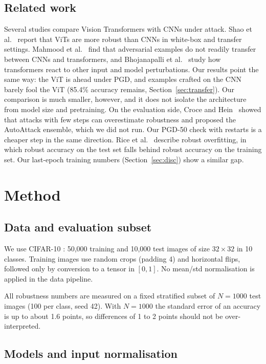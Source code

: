 \documentclass[twoside,a4paper,11pt]{article}
\begin{document}
\subsection{Related work}

Several studies compare Vision Transformers with CNNs under attack.
Shao et al.~\cite{Shao:22} report that ViTs are more robust than CNNs in
white-box and transfer settings. Mahmood et
al.~\cite{Mahmood:21} find that adversarial examples do not readily
transfer between CNNs and transformers, and
Bhojanapalli et al.~\cite{Bhojanapalli:21} study how transformers react to
other input and model perturbations. Our results point the same way: the
ViT is ahead under PGD, and examples crafted on the CNN barely fool the
ViT (85.4\% accuracy remains, Section~\ref{sec:transfer}). Our comparison is much
smaller, however, and it does not isolate the architecture from model size
and pretraining.
On the evaluation side, Croce and Hein~\cite{Croce:20} showed that
attacks with few steps can overestimate robustness and proposed the
AutoAttack ensemble, which we did not run. Our PGD-50 check with
restarts is a cheaper step in the same direction. Rice et
al.~\cite{Rice:20} describe robust overfitting, in which robust accuracy
on the test set falls behind robust accuracy on the training set. Our
last-epoch training numbers (Section~\ref{sec:disc}) show a similar gap.

\section{Method}

\subsection{Data and evaluation subset}

We use CIFAR-10 \cite{Krizhevsky:09}: 50,000 training and 10,000 test
images of size $32 \times 32$ in 10 classes. Training images use random
crops (padding 4) and horizontal flips, followed only by conversion to a
tensor in $[0,1]$. No mean/std normalisation is applied in the data
pipeline.

All robustness numbers are measured on a fixed stratified subset of
$N = 1000$ test images (100 per class, seed 42). With $N = 1000$ the
standard error of an accuracy is up to about 1.6 points, so differences
of 1 to 2 points should not be over-interpreted.

\subsection{Models and input normalisation}
\end{document}
